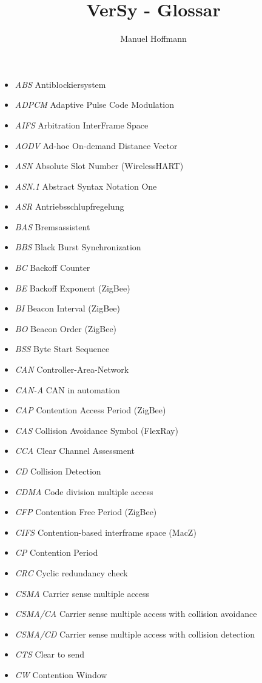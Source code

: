 \documentclass{article}
\title{VerSy - Glossar}
\author{Manuel Hoffmann}
\begin{document}
\begin{itemize}
	\item \emph{ABS} Antiblockiersystem
	\item \emph{ADPCM} Adaptive Pulse Code Modulation
	\item \emph{AIFS} Arbitration InterFrame Space
	\item \emph{AODV} Ad-hoc On-demand Distance Vector
	\item \emph{ASN} Absolute Slot Number (WirelessHART)
	\item \emph{ASN.1} Abstract Syntax Notation One
	\item \emph{ASR} Antriebsschlupfregelung
	\item \emph{BAS} Bremsassistent
	\item \emph{BBS} Black Burst Synchronization
	\item \emph{BC} Backoff Counter
	\item \emph{BE} Backoff Exponent (ZigBee)
	\item \emph{BI} Beacon Interval (ZigBee)
	\item \emph{BO} Beacon Order (ZigBee)
	\item \emph{BSS} Byte Start Sequence
	\item \emph{CAN} Controller-Area-Network
	\item \emph{CAN-A} CAN in automation
	\item \emph{CAP} Contention Access Period (ZigBee)
	\item \emph{CAS} Collision Avoidance Symbol (FlexRay)
	\item \emph{CCA} Clear Channel Assessment
	\item \emph{CD} Collision Detection
	\item \emph{CDMA} Code division multiple access
	\item \emph{CFP} Contention Free Period (ZigBee)
	\item \emph{CIFS} Contention-based interframe space (MacZ)
	\item \emph{CP} Contention Period
	\item \emph{CRC} Cyclic redundancy check
	\item \emph{CSMA} Carrier sense multiple access
	\item \emph{CSMA/CA} Carrier sense multiple access with collision avoidance
	\item \emph{CSMA/CD} Carrier sense multiple access with collision detection
	\item \emph{CTS} Clear to send
	\item \emph{CW} Contention Window

\end{itemize}
\end{document}
